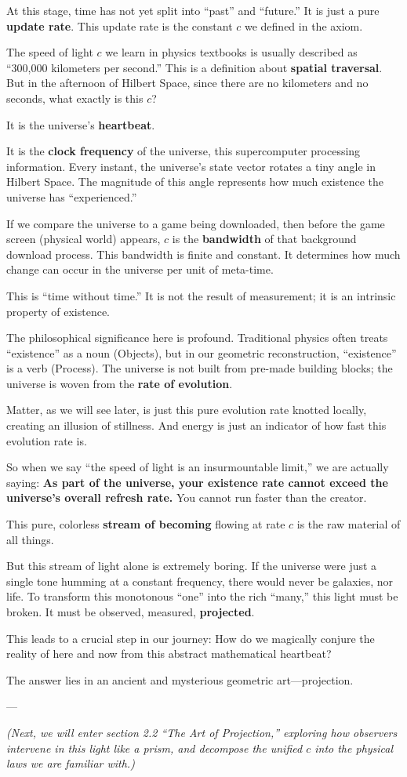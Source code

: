 At this stage, time has not yet split into ``past'' and ``future.'' It is just a pure \textbf{update rate}. This update rate is the constant $c$ we defined in the axiom.

The speed of light $c$ we learn in physics textbooks is usually described as ``300,000 kilometers per second.'' This is a definition about \textbf{spatial traversal}. But in the afternoon of Hilbert Space, since there are no kilometers and no seconds, what exactly is this $c$?

It is the universe's \textbf{heartbeat}.

It is the \textbf{clock frequency} of the universe, this supercomputer processing information. Every instant, the universe's state vector rotates a tiny angle in Hilbert Space. The magnitude of this angle represents how much existence the universe has ``experienced.''

If we compare the universe to a game being downloaded, then before the game screen (physical world) appears, $c$ is the \textbf{bandwidth} of that background download process. This bandwidth is finite and constant. It determines how much change can occur in the universe per unit of meta-time.

This is ``time without time.'' It is not the result of measurement; it is an intrinsic property of existence.

The philosophical significance here is profound. Traditional physics often treats ``existence'' as a noun (Objects), but in our geometric reconstruction, ``existence'' is a verb (Process). The universe is not built from pre-made building blocks; the universe is woven from the \textbf{rate of evolution}.

Matter, as we will see later, is just this pure evolution rate knotted locally, creating an illusion of stillness. And energy is just an indicator of how fast this evolution rate is.

So when we say ``the speed of light is an insurmountable limit,'' we are actually saying: \textbf{As part of the universe, your existence rate cannot exceed the universe's overall refresh rate.} You cannot run faster than the creator.

This pure, colorless \textbf{stream of becoming} flowing at rate $c$ is the raw material of all things.

But this stream of light alone is extremely boring. If the universe were just a single tone humming at a constant frequency, there would never be galaxies, nor life. To transform this monotonous ``one'' into the rich ``many,'' this light must be broken. It must be observed, measured, \textbf{projected}.

This leads to a crucial step in our journey: How do we magically conjure the reality of here and now from this abstract mathematical heartbeat?

The answer lies in an ancient and mysterious geometric art---projection.

---

\textit{(Next, we will enter section 2.2 ``The Art of Projection,'' exploring how observers intervene in this light like a prism, and decompose the unified $c$ into the physical laws we are familiar with.)}

